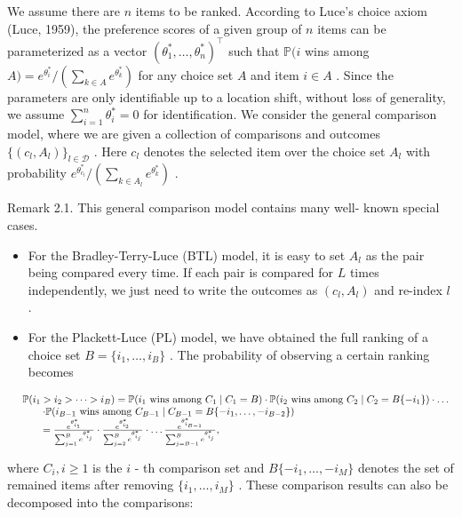 We assume there are \(n\) items to be ranked. According to Luce's choice
axiom (Luce, 1959), the preference scores of a given group of \(n\)
items can be parameterized as a vector
\((\theta_{1}^{*}, \ldots , \theta_{n}^{*})^{\top}\) such that
\(\mathbb{P}(i\) wins among
\(A) = e^{\theta_{i}^{*}} / (\sum_{k \in A} e^{\theta_{k}^{*}})\) for
any choice set \(A\) and item \(i \in A\) . Since the parameters are
only identifiable up to a location shift, without loss of generality, we
assume \(\sum_{i = 1}^{n} \theta_{i}^{*} = 0\) for identification. We
consider the general comparison model, where we are given a collection
of comparisons and outcomes \(\{(c_{l}, A_{l})\}_{l \in \mathcal{D}}\) .
Here \(c_{l}\) denotes the selected item over the choice set \(A_{l}\)
with probability
\(e^{\theta_{c_{l}}^{*}} / (\sum_{k \in A_{l}} e^{\theta_{k}^{*}})\) .

Remark 2.1. This general comparison model contains many well- known
special cases.

\begin{itemize}
\item
  For the Bradley-Terry-Luce (BTL) model, it is easy to set \(A_{l}\) as
  the pair being compared every time. If each pair is compared for \(L\)
  times independently, we just need to write the outcomes as
  \((c_{l}, A_{l})\) and re-index \(l\) .
\item
  For the Plackett-Luce (PL) model, we have obtained the full ranking of
  a choice set \(B = \{i_{1}, \dots , i_{B}\}\) . The probability of
  observing a certain ranking becomes
\end{itemize}

\[
\begin{array}{r l} & {\mathbb{P}(i_{1} > i_{2} > \dots >i_{B}) = \mathbb{P}(i_{1}\mathrm{~wins~among~}C_{1}\mid C_{1} = B)\cdot \mathbb{P}(i_{2}\mathrm{~wins~among~}C_{2}\mid C_{2} = B\{-i_{1}\})\cdot \dots}\\ & {\qquad \cdot \mathbb{P}(i_{B - 1}\mathrm{~wins~among~}C_{B - 1}\mid C_{B - 1} = B\{-i_{1},\dots , - i_{B - 2}\})}\\ & {\qquad = \frac{e^{\theta_{i_{1}}^{*}}}{\sum_{j = 1}^{B}e^{\theta_{i_{j}}^{*}}}\cdot \frac{e^{\theta_{i_{2}}^{*}}}{\sum_{j = 2}^{B}e^{\theta_{i_{j}}^{*}}}\cdot \dots \frac{e^{\theta_{i_{B - 1}}^{*}}}{\sum_{j = B - 1}^{B}e^{\theta_{i_{j}}^{*}}},} \end{array}
\]

where \(C_{i}, i \geq 1\) is the \(i\) - th comparison set and
\(B\{- i_{1}, \dots , - i_{M}\}\) denotes the set of remained items
after removing \(\{i_{1}, \dots , i_{M}\}\) . These comparison results
can also be decomposed into the comparisons:

